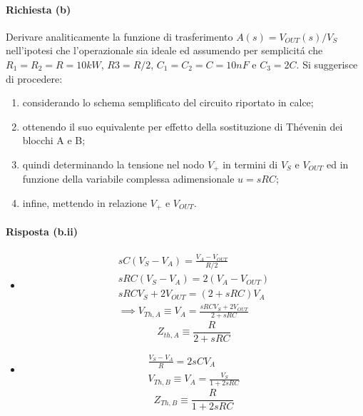 \paragraph{Richiesta (b)}
Derivare analiticamente la funzione di trasferimento $A(s)=V_{OUT}(s)/V_S$ nell'ipotesi che
l'operazionale sia ideale ed assumendo per semplicit\'a che $R_1=R_2=R=10 kW$, $R3=R/2$,
$C_1=C_2=C=10 nF$ e $C_3=2C$. Si suggerisce di procedere:
\begin{enumerate}
\item[i.]
  considerando lo schema semplificato del circuito riportato in calce;
\item[ii.]
  ottenendo il suo equivalente per effetto della sostituzione di Th\'evenin dei blocchi A
  e B;
\item[iii.]
  quindi determinando la tensione nel nodo $V_+$ in termini di $V_S$ e $V_{OUT}$ ed in funzione
  della variabile complessa adimensionale $u = sRC$;
\item[iv.]
  infine, mettendo in relazione $V_+$ e $V_{OUT}$.
\end{enumerate}
\paragraph{Risposta (b.ii)}
\begin{itemize}
\item[a.]
  \begin{equation*}
    \begin{gathered}
      sC(V_S - V_A) = \frac{V_A - V_{OUT}}{R/2} \\
      sRC(V_S - V_A) = 2(V_A - V_{OUT}) \\
      sRCV_S + 2V_{OUT} = (2 + sRC)V_A \\ \implies
      V_{Th, A} \equiv V_A = \frac{sRCV_S + 2V_{OUT}}{2 + sRC}
    \end{gathered}
  \end{equation*}
  \begin{equation*}
    Z_{th, A} \equiv \frac{R}{2 + sRC}
  \end{equation*}
\item[b.]
  \begin{equation*}
    \begin{gathered}
      \frac{V_S - V_A}{R} = 2sCV_A \\
      V_{Th, B} \equiv V_A = \frac{V_S}{1 + 2sRC}
    \end{gathered}
  \end{equation*}
  \begin{equation*}
    Z_{Th, B} \equiv \frac{R}{1 + 2sRC}
  \end{equation*}
\end{itemize}

